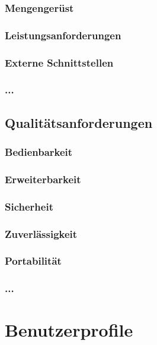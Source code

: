 \documentclass[11pt]{article}
\begin{document}
\subsubsection{Mengengerüst}

\subsubsection{Leistungsanforderungen}

\subsubsection{Externe Schnittstellen}

\subsubsection{...}

\subsection{Qualitätsanforderungen}

\subsubsection{Bedienbarkeit}

\subsubsection{Erweiterbarkeit}

\subsubsection{Sicherheit}

\subsubsection{Zuverlässigkeit}

\subsubsection{Portabilität}

\subsubsection{...}

\section{Benutzerprofile}
\end{document}
